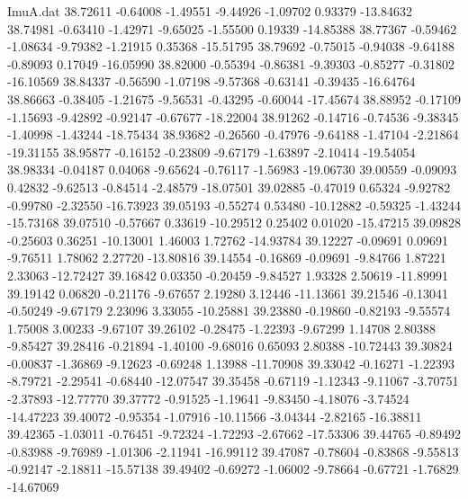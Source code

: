 \begin{filecontents}{ImuA.dat}
  38.72611   -0.64008   -1.49551   -9.44926   -1.09702    0.93379  -13.84632
  38.74981   -0.63410   -1.42971   -9.65025   -1.55500    0.19339  -14.85388
  38.77367   -0.59462   -1.08634   -9.79382   -1.21915    0.35368  -15.51795
  38.79692   -0.75015   -0.94038   -9.64188   -0.89093    0.17049  -16.05990
  38.82000   -0.55394   -0.86381   -9.39303   -0.85277   -0.31802  -16.10569
  38.84337   -0.56590   -1.07198   -9.57368   -0.63141   -0.39435  -16.64764
  38.86663   -0.38405   -1.21675   -9.56531   -0.43295   -0.60044  -17.45674
  38.88952   -0.17109   -1.15693   -9.42892   -0.92147   -0.67677  -18.22004
  38.91262   -0.14716   -0.74536   -9.38345   -1.40998   -1.43244  -18.75434
  38.93682   -0.26560   -0.47976   -9.64188   -1.47104   -2.21864  -19.31155
  38.95877   -0.16152   -0.23809   -9.67179   -1.63897   -2.10414  -19.54054
  38.98334   -0.04187    0.04068   -9.65624   -0.76117   -1.56983  -19.06730
  39.00559   -0.09093    0.42832   -9.62513   -0.84514   -2.48579  -18.07501
  39.02885   -0.47019    0.65324   -9.92782   -0.99780   -2.32550  -16.73923
  39.05193   -0.55274    0.53480  -10.12882   -0.59325   -1.43244  -15.73168
  39.07510   -0.57667    0.33619  -10.29512    0.25402    0.01020  -15.47215
  39.09828   -0.25603    0.36251  -10.13001    1.46003    1.72762  -14.93784
  39.12227   -0.09691    0.09691   -9.76511    1.78062    2.27720  -13.80816
  39.14554   -0.16869   -0.09691   -9.84766    1.87221    2.33063  -12.72427
  39.16842    0.03350   -0.20459   -9.84527    1.93328    2.50619  -11.89991
  39.19142    0.06820   -0.21176   -9.67657    2.19280    3.12446  -11.13661
  39.21546   -0.13041   -0.50249   -9.67179    2.23096    3.33055  -10.25881
  39.23880   -0.19860   -0.82193   -9.55574    1.75008    3.00233   -9.67107
  39.26102   -0.28475   -1.22393   -9.67299    1.14708    2.80388   -9.85427
  39.28416   -0.21894   -1.40100   -9.68016    0.65093    2.80388  -10.72443
  39.30824   -0.00837   -1.36869   -9.12623   -0.69248    1.13988  -11.70908
  39.33042   -0.16271   -1.22393   -8.79721   -2.29541   -0.68440  -12.07547
  39.35458   -0.67119   -1.12343   -9.11067   -3.70751   -2.37893  -12.77770
  39.37772   -0.91525   -1.19641   -9.83450   -4.18076   -3.74524  -14.47223
  39.40072   -0.95354   -1.07916  -10.11566   -3.04344   -2.82165  -16.38811
  39.42365   -1.03011   -0.76451   -9.72324   -1.72293   -2.67662  -17.53306
  39.44765   -0.89492   -0.83988   -9.76989   -1.01306   -2.11941  -16.99112
  39.47087   -0.78604   -0.83868   -9.55813   -0.92147   -2.18811  -15.57138
  39.49402   -0.69272   -1.06002   -9.78664   -0.67721   -1.76829  -14.67069

\end{filecontents}
